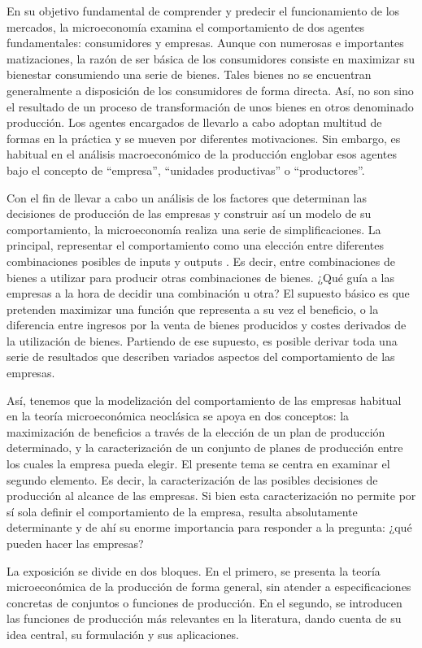 \documentclass{nuevotema}
\begin{document}
\ideaclave

En su objetivo fundamental de comprender y predecir el funcionamiento de los mercados, la microeconomía examina el comportamiento de dos agentes fundamentales: consumidores y empresas. Aunque con numerosas e importantes matizaciones, la razón de ser básica de los consumidores consiste en maximizar su bienestar consumiendo una serie de bienes. Tales bienes no se encuentran generalmente a disposición de los consumidores de forma directa. Así, no son sino el resultado de un proceso de transformación de unos bienes en otros denominado producción. Los agentes encargados de llevarlo a cabo adoptan multitud de formas en la práctica y se mueven por diferentes motivaciones. Sin embargo, es habitual en el análisis macroeconómico de la producción englobar esos agentes bajo el concepto de ``empresa'', ``unidades productivas'' o ``productores''. 

Con el fin de llevar a cabo un análisis de los factores que determinan las decisiones de producción de las empresas y construir así un modelo de su comportamiento, la microeconomía realiza una serie de simplificaciones. La principal, representar el comportamiento como una elección entre diferentes combinaciones posibles de inputs y outputs . Es decir, entre combinaciones de bienes a utilizar para producir otras combinaciones de bienes. ¿Qué guía a las empresas a la hora de decidir una combinación u otra? El supuesto básico es que pretenden maximizar una función que representa a su vez el beneficio, o la diferencia entre ingresos por la venta de bienes producidos y costes derivados de la utilización de bienes. Partiendo de ese supuesto, es posible derivar toda una serie de resultados que describen variados aspectos del comportamiento de las empresas.

Así, tenemos que la modelización del comportamiento de las empresas habitual en la teoría microeconómica neoclásica se apoya en dos conceptos: la maximización de beneficios a través de la elección de un plan de producción determinado, y la caracterización de un conjunto de planes de producción entre los cuales la empresa pueda elegir. El presente tema se centra en examinar el segundo elemento. Es decir, la caracterización de las posibles decisiones de producción al alcance de las empresas. Si bien esta caracterización no permite por sí sola definir el comportamiento de la empresa, resulta absolutamente determinante y de ahí su enorme importancia para responder a la pregunta: ¿qué pueden hacer las empresas?

La exposición se divide en dos bloques. En el primero, se presenta la teoría microeconómica de la producción de forma general, sin atender a especificaciones concretas de conjuntos o funciones de producción. En el segundo, se introducen las funciones de producción más relevantes en la literatura, dando cuenta de su idea central, su formulación y sus aplicaciones.
\end{document}

